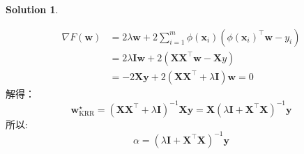 \documentclass[a4paper,UTF8]{article}
\numberwithin{equation}{section}
\theoremstyle{definition}
\newtheorem*{solution}{Solution}
\begin{document}
\begin{solution}
\begin{enumerate}
        \begin{equation}
            \begin{aligned} \nabla F(\boldsymbol{w}) & =2 \lambda \boldsymbol{w}+2 \sum_{i=1}^{m} \phi\left(\boldsymbol{x}_{i}\right)\left(\phi\left(\boldsymbol{x}_{i}\right)^{\top} \boldsymbol{w}-y_{i}\right) \\ &= 2\lambda\mathbf{I}\boldsymbol{w}+2(\boldsymbol{X}\boldsymbol{X}^{\top}\boldsymbol{w}-\boldsymbol{X}y)\\& =-2 \boldsymbol{X} \boldsymbol{y}+2\left(\boldsymbol{X} \boldsymbol{X}^{\top}+\lambda \mathbf{I}\right) \boldsymbol{w}=0\end{aligned}
        \end{equation}
        解得：$$\boldsymbol{w}_{\mathrm{KRR}}^{\star}=\left(\boldsymbol{X} \boldsymbol{X}^{\top}+\lambda \mathbf{I}\right)^{-1} \boldsymbol{X} \boldsymbol{y}=\boldsymbol{X}\left(\lambda \mathbf{I}+\boldsymbol{X}^{\top} \boldsymbol{X}\right)^{-1} \boldsymbol{y}$$
        所以: $$\alpha = \left(\lambda \mathbf{I}+\boldsymbol{X}^{\top} \boldsymbol{X}\right)^{-1} \boldsymbol{y}$$
    \end{enumerate}
\end{solution}

\newpage
\end{document}
